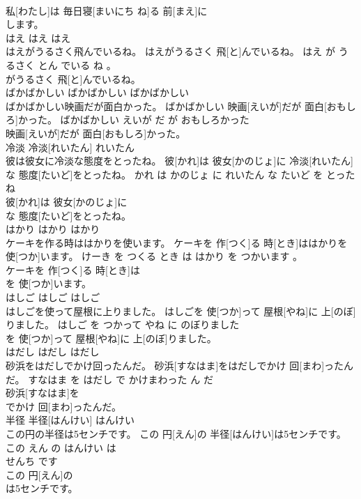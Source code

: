 \documentclass[8pt]{extreport}
\begin{document}
\begin{CJK}{UTF8}{min}
\\	私[わたし]は 毎日寝[まいにち ね]る 前[まえ]に
\\	します。			
\\	はえ	はえ	はえ	
\\	はえがうるさく飛んでいるね。	はえがうるさく 飛[と]んでいるね。	はえ が うるさく とん でいる ね 。	
\\	がうるさく 飛[と]んでいるね。			
\\	ばかばかしい	ばかばかしい	ばかばかしい	
\\	ばかばかしい映画だが面白かった。	ばかばかしい 映画[えいが]だが 面白[おもしろ]かった。	ばかばかしい えいが だ が おもしろかった	
\\	映画[えいが]だが 面白[おもしろ]かった。			
\\	冷淡	冷淡[れいたん]	れいたん	
\\	彼は彼女に冷淡な態度をとったね。	彼[かれ]は 彼女[かのじょ]に 冷淡[れいたん]な 態度[たいど]をとったね。	かれ は かのじょ に れいたん な たいど を とった ね	
\\	彼[かれ]は 彼女[かのじょ]に
\\	な 態度[たいど]をとったね。			
\\	はかり	はかり	はかり	
\\	ケーキを作る時ははかりを使います。	ケーキを 作[つく]る 時[とき]ははかりを 使[つか]います。	けーき を つくる とき は はかり を つかいます 。	
\\	ケーキを 作[つく]る 時[とき]は
\\	を 使[つか]います。			
\\	はしご	はしご	はしご	
\\	はしごを使って屋根に上りました。	はしごを 使[つか]って 屋根[やね]に 上[のぼ]りました。	はしご を つかって やね に のぼりました	
\\	を 使[つか]って 屋根[やね]に 上[のぼ]りました。			
\\	はだし	はだし	はだし	
\\	砂浜をはだしでかけ回ったんだ。	砂浜[すなはま]をはだしでかけ 回[まわ]ったんだ。	すなはま を はだし で かけまわった ん だ	
\\	砂浜[すなはま]を
\\	でかけ 回[まわ]ったんだ。			
\\	半径	半径[はんけい]	はんけい	
\\	この円の半径は5センチです。	この 円[えん]の 半径[はんけい]は5センチです。	この えん の はんけい は 
\\	せんち です	
\\	この 円[えん]の
\\	は5センチです。			

\end{CJK}
\end{document}
